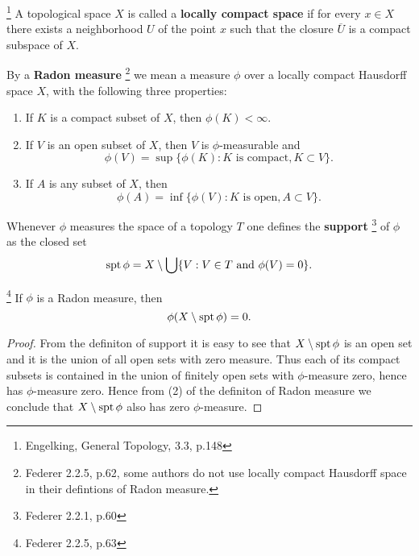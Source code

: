 \begin{definition}
\footnote{Engelking, General Topology, 3.3, p.148}
A topological space $X$ is called a \textbf{locally compact space}
if for every
$x\in X$ there exists a neighborhood $U$ of the point $x$ such that the closure
$\overline{U}$ is a compact subspace of $X$.
\end{definition}

\begin{definition}
By a \textbf{Radon measure} 
\footnote{Federer 2.2.5, p.62, some authors do not use locally compact Hausdorff space
    in their defintions of Radon measure.}
we mean a measure $\phi$ over a locally compact
Hausdorff space $X$, with the following three properties:
\begin{enumerate}
  \item[(1)] If $K$ is a compact subset of $X$, then $\phi(K)<\infty$.
  \item[(2)] If $V$ is an open subset of $X$, then $V$ is $\phi$-measurable and
    \[
      \phi(V)=\sup\{ \phi(K): \text{$K$ is compact}, K\subset V \}.
    \]
  \item[(3)] If $A$ is any subset of $X$, then
    \[
      \phi(A)=\inf\{ \phi(V): \text{$K$ is open}, A\subset V \}.
    \]
\end{enumerate}
\end{definition}

\begin{definition}
Whenever $\phi$ measures the space of a topology $T$ one defines the
\textbf{support}
\footnote{Federer 2.2.1, p.60}
of $\phi$ as the closed set
\[
  \operatorname*{spt} \phi = X\setminus\bigcup\{V: \text{$V\in T$ and $\phi(V)=0$} \}.
\]
\end{definition}


\begin{proposition}
\footnote{Federer 2.2.5, p.63}
If $\phi$ is a Radon measure, then
\[
  \phi(X\setminus\operatorname*{spt}\phi) = 0.
\]
\end{proposition}
\begin{proof}
From the definiton of support it is easy to see that $X\setminus\operatorname*{spt}\phi$ is an
open set and it is the union of all open sets with zero measure. Thus each of
its compact subsets is contained in the union of finitely open sets with
$\phi$-measure zero, hence has $\phi$-measure zero. 
Hence from (2) of the definiton of Radon measure we conclude that 
$X\setminus\operatorname*{spt}\phi$ also has zero $\phi$-measure.
\end{proof}

